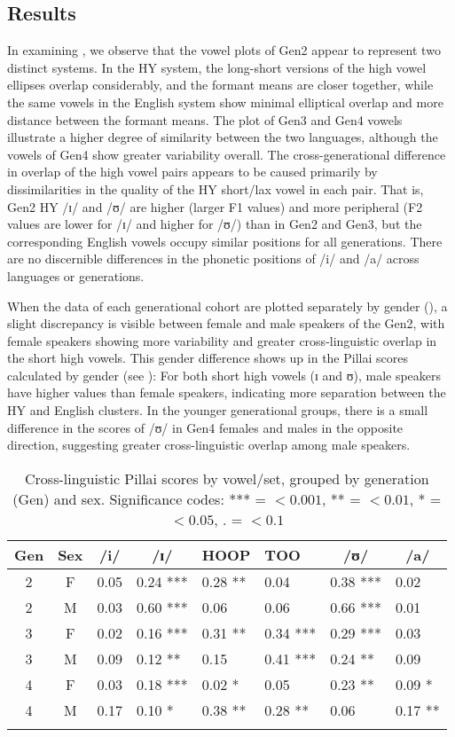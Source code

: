 \documentclass[output=paper]{langsci/langscibook}
\begin{document}
 
\subsection{Results}\largerpage
\label{sec:nove:4.3}

In examining , we observe that the vowel plots of Gen2 appear to represent two distinct systems. In the HY system, the long-short versions of the high vowel ellipses overlap considerably, and the formant means are closer together, while the same vowels in the English system show minimal elliptical overlap and more distance between the formant means. The plot of Gen3 and Gen4 vowels illustrate a higher degree of similarity between the two languages, although the vowels of Gen4 show greater variability overall. The cross-generational difference in overlap of the high vowel pairs appears to be caused primarily by dissimilarities in the quality of the HY short/lax vowel in each pair. That is, Gen2 HY /ɪ/ and /ʊ/ are higher (larger F1 values) and more peripheral (F2 values are lower for /ɪ/ and higher for /ʊ/) than in Gen2 and Gen3, but the corresponding English vowels occupy similar positions for all generations. There are no discernible differences in the phonetic positions of /i/ and /a/ across languages or generations. 

When the data of each generational cohort are plotted separately by gender (), a slight discrepancy is visible between female and male speakers of the Gen2, with female speakers showing more variability and greater cross-linguistic overlap in the short high vowels. This gender difference shows up in the Pillai scores calculated by gender (see ): For both short high vowels (ɪ and ʊ), male speakers have higher values than female speakers, indicating more separation between the HY and English clusters. In the younger generational groups, there is a small difference in the scores of /ʊ/ in Gen4 females and males in the opposite direction, suggesting greater cross-linguistic overlap among male speakers. 

\begin{table}
\begin{tabular}{ccc *{5}{l}}
\lsptoprule
Gen & Sex & /i/ & \multicolumn{1}{c}{/ɪ/} & HOOP  & TOO  & \multicolumn{1}{c}{/ʊ/}  & \multicolumn{1}{c}{/a/} \\
\midrule
2 & F & 0.05 & 0.24 *** & 0.28 ** & 0.04 & 0.38 *** & 0.02 \\
2 & M & 0.03 & 0.60 *** & 0.06 & 0.06 & 0.66 *** & 0.01  \\
3 & F & 0.02 & 0.16 *** & 0.31 ** & 0.34 *** & 0.29 *** & 0.03 \\
3 & M & 0.09 & 0.12 ** & 0.15 & 0.41 *** & 0.24 ** & 0.09  \\
4 & F & 0.03 & 0.18 *** & 0.02 * & 0.05 & 0.23 ** & 0.09 *\\
4 & M & 0.17 & 0.10 * & 0.38 ** & 0.28 ** & 0.06 & 0.17 **\\
\lspbottomrule
\end{tabular}
\caption{Cross-linguistic Pillai scores by vowel/set, grouped by generation (Gen) and sex. Significance codes: *** = $<0.001$, ** = $<0.01$, * = $<0.05$, . = $<0.1$}
\label{tab:nove:3}
\end{table}
\end{document}
